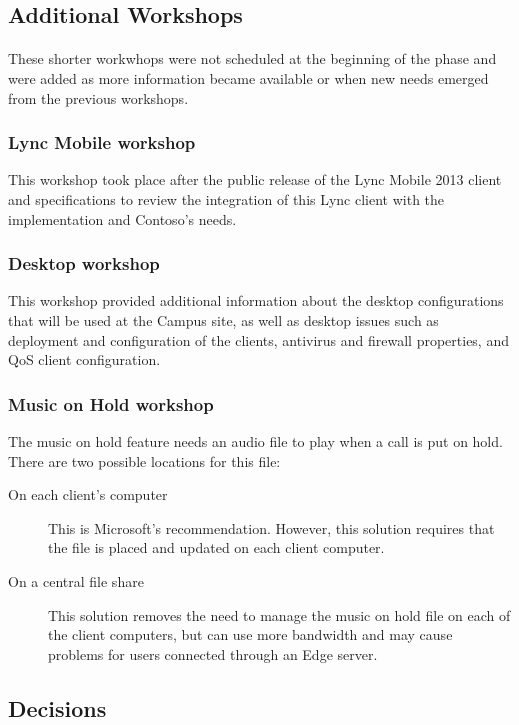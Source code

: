 \subsection{Additional Workshops}
	\paragraph{}
		These shorter workwhops were not scheduled at the beginning of the phase and were added as more information became available or when new needs emerged from the previous workshops.
		
	\subsubsection{Lync Mobile workshop}
		This workshop took place after the public release of the Lync Mobile 2013 client and specifications to review the integration of this Lync client with the implementation and Contoso's needs.
	
	\subsubsection{Desktop workshop}
		This workshop provided additional information about the desktop configurations that will be used at the Campus site, as well as desktop issues such as deployment and configuration of the clients, antivirus and firewall properties, and QoS client configuration.
	
	
	\subsubsection{Music on Hold workshop}
		The music on hold feature needs an audio file to play when a call is put on hold. There are two possible locations for this file:
		\begin{description}
			\item[On each client's computer] This is Microsoft's recommendation. However, this solution requires that the file is placed and updated on each client computer.
			\item[On a central file share] This solution removes the need to manage the music on hold file on each of the client computers, but can use more bandwidth and may cause problems for users connected through an Edge server.
		\end{description}

\subsection{Decisions}
